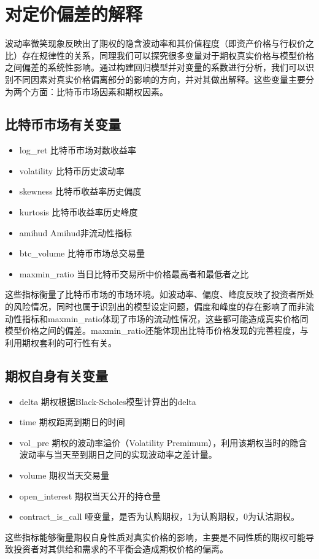     \section{对定价偏差的解释}\label{reg vars}
    波动率微笑现象反映出了期权的隐含波动率和其价值程度（即资产价格与行权价之比）存在规律性的关系，同理我们可以探究很多变量对于期权真实价格与模型价格之间偏差的系统性影响。通过构建回归模型并对变量的系数进行分析，我们可以识别不同因素对真实价格偏离部分的影响的方向，并对其做出解释。这些变量主要分为两个方面：比特币市场因素和期权因素。
    \subsection{比特币市场有关变量}
    \begin{itemize}
        \item log\_ret 比特币市场对数收益率
        \item volatility 比特币历史波动率
        \item skewness 比特币收益率历史偏度
        \item kurtosis 比特币收益率历史峰度
        \item amihud Amihud非流动性指标
        \item btc\_volume 比特币市场总交易量
        \item maxmin\_ratio 当日比特币交易所中价格最高者和最低者之比
    \end{itemize}
    
    这些指标衡量了比特币市场的市场环境。如波动率、偏度、峰度反映了投资者所处的风险情况，同时也属于识别出的模型设定问题，偏度和峰度的存在影响了而非流动性指标和maxmin\_ratio体现了市场的流动性情况，这些都可能造成真实价格同模型价格之间的偏差。maxmin\_ratio还能体现出比特币价格发现的完善程度，与利用期权套利的可行性有关。
    \subsection{期权自身有关变量}
    \begin{itemize}
        \item delta 期权根据Black-Scholes模型计算出的delta
        \item time 期权距离到期日的时间
        \item vol\_pre 期权的波动率溢价（Volatility Premimum），利用该期权当时的隐含波动率与当天至到期日之间的实现波动率之差计量。
        \item volume 期权当天交易量                                     
        
        \item open\_interest 期权当天公开的持仓量
        \item contract\_is\_call 哑变量，是否为认购期权，1为认购期权，0为认沽期权。 
    \end{itemize}
    这些指标能够衡量期权自身性质对真实价格的影响，主要是不同性质的期权可能导致投资者对其供给和需求的不平衡会造成期权价格的偏离。

